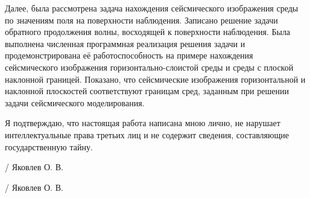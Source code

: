 \documentclass[a4paper, fontsize=14pt]{article}
\begin{document}
	Далее, была рассмотрена задача нахождения сейсмического изображения среды по значениям поля на поверхности наблюдения. Записано решение задачи обратного продолжения волны, восходящей к поверхности наблюдения. 
	Была выполнена численная программная реализация решения задачи и продемонстрирована её работоспособность на примере нахождения  сейсмического изображения горизонтально-слоистой среды и среды с плоской наклонной границей. Показано, что сейсмические изображения горизонтальной и наклонной плоскостей соответствуют границам сред, заданным при решении задачи сейсмического моделирования.
	
	
	

	Я подтверждаю, что настоящая работа написана мною лично, не нарушает интеллектуальные права третьих лиц и не содержит сведения, составляющие государственную тайну.
	
	\vspace{2\baselineskip}
	\hspace{0.5\textwidth}\hrulefill / Яковлев О. В.
	
	\newpage
	
	
	\printbibliography
		
	\vspace{2\baselineskip}
	\hspace{0.5\textwidth}\hrulefill / Яковлев О. В.
	
	\newpage
	\appendix
	
	
	
	
\end{document}
